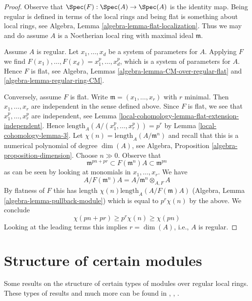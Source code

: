 \begin{proof}
Observe that $\Spec(F) : \Spec(A) \to \Spec(A)$ is the identity map.
Being regular is defined in terms of the local rings and being flat
is something about local rings, see
Algebra, Lemma \ref{algebra-lemma-flat-localization}.
Thus we may and do assume $A$ is a Noetherian
local ring with maximal ideal $\mathfrak m$.

\medskip\noindent
Assume $A$ is regular. Let $x_1, \ldots, x_d$ be a
system of parameters for $A$. Applying $F$ we find
$F(x_1), \ldots, F(x_d) = x_1^p, \ldots, x_d^p$,
which is a system of parameters for $A$. Hence $F$ is flat, see
Algebra, Lemmas \ref{algebra-lemma-CM-over-regular-flat} and
\ref{algebra-lemma-regular-ring-CM}.

\medskip\noindent
Conversely, assume $F$ is flat. Write $\mathfrak m = (x_1, \ldots, x_r)$
with $r$ minimal. Then $x_1, \ldots, x_r$ are independent in the sense
defined above. Since $F$ is flat, we see that $x_1^p, \ldots, x_r^p$
are independent, see Lemma \ref{local-cohomology-lemma-flat-extension-independent}.
Hence $\text{length}_A(A/(x_1^p, \ldots, x_r^p)) = p^r$ by
Lemma \ref{local-cohomology-lemma-3}.
Let $\chi(n) = \text{length}_A(A/\mathfrak m^n)$ and recall
that this is a numerical polynomial of degree $\dim(A)$, see
Algebra, Proposition \ref{algebra-proposition-dimension}.
Choose $n \gg 0$. Observe that
$$
\mathfrak m^{pn + pr} \subset F(\mathfrak m^n)A \subset \mathfrak m^{pn}
$$
as can be seen by looking at monomials in $x_1, \ldots, x_r$. We have
$$
A/F(\mathfrak m^n)A = A/\mathfrak m^n \otimes_{A, F} A
$$
By flatness of $F$ this has length $\chi(n) \text{length}_A(A/F(\mathfrak m)A)$
(Algebra, Lemma \ref{algebra-lemma-pullback-module})
which is equal to $p^r\chi(n)$ by the above. We conclude
$$
\chi(pn + pr) \geq p^r\chi(n) \geq \chi(pn)
$$
Looking at the leading terms this implies $r = \dim(A)$, i.e., $A$ is regular.
\end{proof}

\section{Structure of certain modules}
\label{local-cohomology-section-structure}
Some results on the structure of certain types of
modules over regular local rings. These types of
results and much more can be found in
\cite{Huneke-Sharp}, \cite{Lyubeznik}, \cite{Lyubeznik2}.


